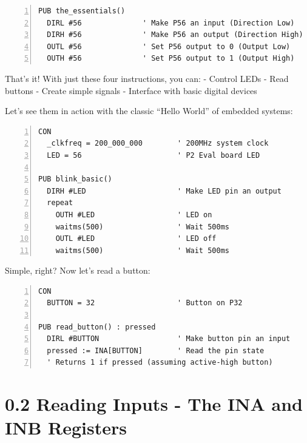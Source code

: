\documentclass[11pt,a4paper,oneside,english]{book}
\begin{document}
\begin{Spin2Block}
\begin{Verbatim}[numbers=left,numbersep=5pt,xleftmargin=15pt]
PUB the_essentials()
  DIRL #56              ' Make P56 an input (Direction Low)
  DIRH #56              ' Make P56 an output (Direction High)
  OUTL #56              ' Set P56 output to 0 (Output Low)
  OUTH #56              ' Set P56 output to 1 (Output High)
\end{Verbatim}
\end{Spin2Block}

That's it! With just these four instructions, you can: - Control LEDs -
Read buttons - Create simple signals - Interface with basic digital
devices

Let's see them in action with the classic ``Hello World'' of embedded
systems:

\begin{Spin2Block}
\begin{Verbatim}[numbers=left,numbersep=5pt,xleftmargin=15pt]
CON
  _clkfreq = 200_000_000        ' 200MHz system clock
  LED = 56                      ' P2 Eval board LED

PUB blink_basic()
  DIRH #LED                     ' Make LED pin an output
  repeat
    OUTH #LED                   ' LED on
    waitms(500)                 ' Wait 500ms
    OUTL #LED                   ' LED off
    waitms(500)                 ' Wait 500ms
\end{Verbatim}
\end{Spin2Block}

Simple, right? Now let's read a button:

\begin{Spin2Block}
\begin{Verbatim}[numbers=left,numbersep=5pt,xleftmargin=15pt]
CON
  BUTTON = 32                   ' Button on P32

PUB read_button() : pressed
  DIRL #BUTTON                  ' Make button pin an input
  pressed := INA[BUTTON]        ' Read the pin state
  ' Returns 1 if pressed (assuming active-high button)
\end{Verbatim}
\end{Spin2Block}

\hypertarget{reading-inputs---the-ina-and-inb-registers}{%
\section{0.2 Reading Inputs - The INA and INB
Registers}\label{reading-inputs---the-ina-and-inb-registers}}
\end{document}
